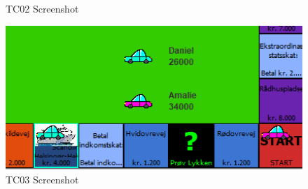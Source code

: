 \begin{flushleft}
\begin{figure}[H]
    \caption{TC02 Screenshot}
    \label{TC02Bilag}
\end{figure}\begin{figure}[H] %
    \centering
    \includegraphics[width=16cm]{Report/figures/Usertests/BilagTC03.png}
    \caption{TC03 Screenshot}
    \label{TC03Bilag}
\end{figure}
\end{flushleft}

\label{endOfDoc}